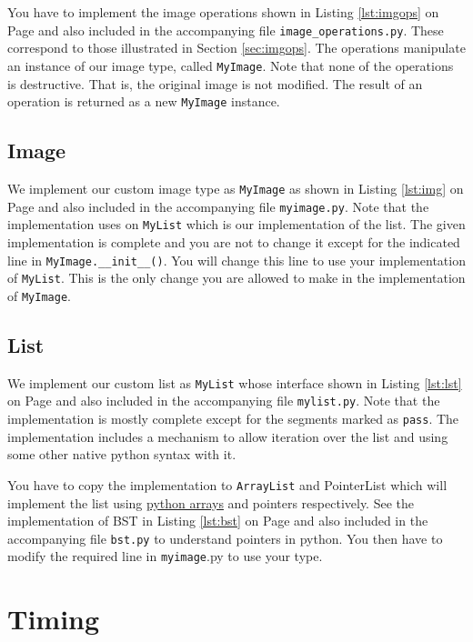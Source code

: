 \documentclass[addpoints]{exam}
\begin{document}
You have to implement the image operations shown in Listing \ref{lst:imgops} on Page \pageref{lst:imgops} and also included in the accompanying file \texttt{image\_operations.py}. These correspond to those illustrated in Section \ref{sec:imgops}. The operations manipulate an instance of our image type,  called \texttt{MyImage}. Note that none of the operations is destructive. That is, the original image is not modified. The result of an operation is returned as a new \texttt{MyImage} instance. 

\subsection{Image}

We implement our custom image type as \texttt{MyImage} as shown in Listing \ref{lst:img} on Page \pageref{lst:img} and also included in the accompanying file \texttt{myimage.py}. Note that the implementation uses on \texttt{MyList} which is our implementation of the list. The given implementation is complete and you are not to change it except for the indicated line in \texttt{MyImage.\_\_init\_\_()}. You will change this line to use your implementation of \texttt{MyList}. This is the only change you are allowed to make in the implementation of \texttt{MyImage}.

\subsection{List}

We implement our custom list as \texttt{MyList} whose interface shown in Listing \ref{lst:lst} on Page \pageref{lst:lst} and also included in the accompanying file \texttt{mylist.py}. Note that the implementation is mostly complete except for the segments marked as \texttt{pass}. The implementation includes a mechanism to allow iteration over the list and using some other native python syntax with it.

You have to copy the implementation to \texttt{ArrayList} and \textsf{PointerList} which will implement the list using \href{https://www.programiz.com/python-programming/array}{python arrays} and pointers respectively. See the implementation of BST in Listing \ref{lst:bst} on Page \pageref{lst:bst} and also included in the accompanying file \texttt{bst.py} to understand pointers in python. You then have to modify the required line in \texttt{myimage}.py to use your type.

\section{Timing}
\end{document}
